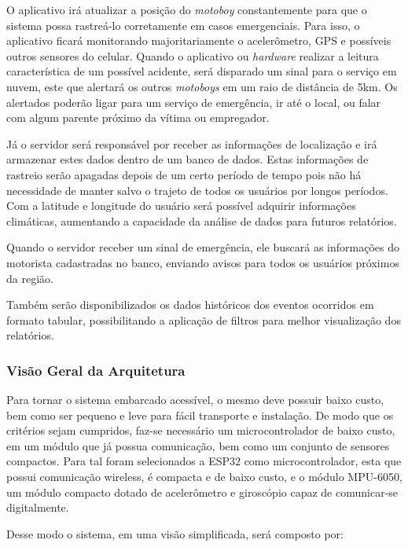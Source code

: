O aplicativo irá atualizar a posição do \textit{motoboy} constantemente para que o sistema possa rastreá-lo corretamente em casos emergenciais. Para isso, o aplicativo ficará monitorando majoritariamente o acelerômetro, GPS e possíveis outros sensores do celular.
Quando o aplicativo ou \textit{hardware} realizar a leitura característica de um possível acidente, será disparado um sinal para o serviço em nuvem, este que alertará os outros \textit{motoboys} em um raio de distância de 5km. Os alertados poderão ligar para um serviço de emergência, ir até o local, ou falar com algum parente próximo da vítima ou empregador.

Já o servidor será responsável por receber as informações de localização e irá armazenar estes dados dentro de um banco de dados. Estas informações de rastreio serão apagadas depois de um certo período de tempo pois não há necessidade de manter salvo o trajeto de todos os usuários por longos períodos. Com a latitude e longitude do usuário será possível adquirir informações climáticas, aumentando a capacidade da análise de dados para futuros relatórios.

Quando o servidor receber um sinal de emergência, ele buscará as informações do motorista cadastradas no banco, enviando avisos para todos os usuários próximos da região.

Também serão disponibilizados os dados históricos dos eventos ocorridos em formato tabular, possibilitando a aplicação de filtros para melhor visualização dos relatórios.








\subsubsection{Visão Geral da Arquitetura}

Para tornar o sistema embarcado acessível, o mesmo deve possuir baixo custo, bem como ser pequeno e leve para fácil transporte e instalação. De modo que os critérios sejam cumpridos, faz-se necessário um microcontrolador de baixo custo, em um módulo que já possua comunicação, bem como um conjunto de sensores compactos. Para tal foram selecionados a ESP32 como microcontrolador, esta que possui comunicação wireless, é compacta e de baixo custo, e o módulo MPU-6050, um módulo compacto dotado de acelerômetro e giroscópio capaz de comunicar-se digitalmente.

Desse modo o sistema, em uma visão simplificada, será composto por:


